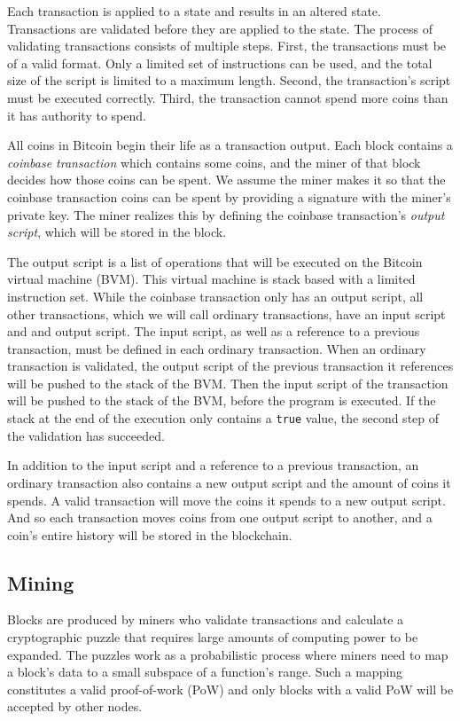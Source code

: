 Each transaction is applied to a state and results in an altered state. Transactions are validated before they are applied to the state. The process of validating transactions consists of multiple steps. First, the transactions must be of a valid format. Only a limited set of instructions can be used, and the total size of the script is limited to a maximum length. Second, the transaction's script must be executed correctly. Third, the transaction cannot spend more coins than it has authority to spend.

All coins in Bitcoin begin their life as a transaction output. Each block contains a \emph{coinbase transaction} which contains some coins, and the miner of that block decides how those coins can be spent. We assume the miner makes it so that the coinbase transaction coins can be spent by providing a signature with the miner's private key. The miner realizes this by defining the coinbase transaction's \emph{output script}, which will be stored in the block. 

The output script is a list of operations that will be executed on the Bitcoin virtual machine (BVM). This virtual machine is stack based with a limited instruction set. While the coinbase transaction only has an output script, all other transactions, which we will call ordinary transactions, have an input script and and output script. The input script, as well as a reference to a previous transaction, must be defined in each ordinary transaction. When an ordinary transaction is validated, the output script of the previous transaction it references will be pushed to the stack of the BVM. Then the input script of the transaction will be pushed to the stack of the BVM, before the program is executed. If the stack at the end of the execution only contains a \texttt{true} value, the second step of the validation has succeeded. 

In addition to the input script and a reference to a previous transaction, an ordinary transaction also contains a new output script and the amount of coins it spends. A valid transaction will move the coins it spends to a new output script. And so each transaction moves coins from one output script to another, and a coin's entire history will be stored in the blockchain. 

\subsection{Mining}

Blocks are produced by miners who validate transactions and calculate a cryptographic puzzle that requires large amounts of computing power to be expanded. The puzzles work as a probabilistic process where miners need to map a block's data to a small subspace of a function's range. Such a mapping constitutes a valid proof-of-work (PoW) and only blocks with a valid PoW will be accepted by other nodes. 


